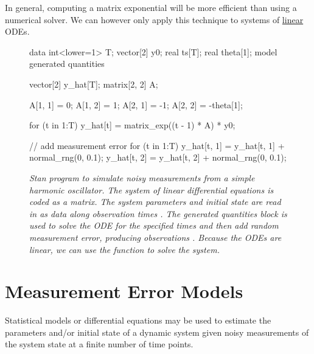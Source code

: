 In general, computing a matrix exponential will be more efficient than using a numerical
solver. We can however only apply this technique to systems of \underline{linear} ODEs.
%
\begin{figure}
\begin{stancode}
data {
  int<lower=1> T;
  vector[2] y0;
  real ts[T];
  real theta[1];
}
model {
}
generated quantities {
  vector[2] y_hat[T];
  matrix[2, 2] A;
  
  A[1, 1] = 0;
  A[1, 2] = 1;
  A[2, 1] = -1;
  A[2, 2] = -theta[1];
  
  for (t in 1:T)
    y_hat[t] = matrix_exp((t - 1) * A) * y0;
  
  // add measurement error
  for (t in 1:T) {
    y_hat[t, 1] = y_hat[t, 1] + normal_rng(0, 0.1);
    y_hat[t, 2] = y_hat[t, 2] + normal_rng(0, 0.1);
  }
}
\end{stancode}
\vspace*{-0.2in}
\caption{\small\it Stan program to simulate noisy measurements from a
  simple harmonic oscillator.  The system of linear differential equations is
  coded as a matrix. The system parameters  and initial
  state  are read in as data along  observation times . 
  The generated quantities block is used to solve the ODE for the specified
  times and then add random measurement error, producing observations 
  . Because the ODEs are linear, we can use the 
  function to solve the system. }\label{sho-sim-me.figure}
\end{figure}
  

\section{Measurement Error Models}

Statistical models or differential equations may be used to estimate
the parameters and/or initial state of a dynamic system given noisy
measurements of the system state at a finite number of time points.

